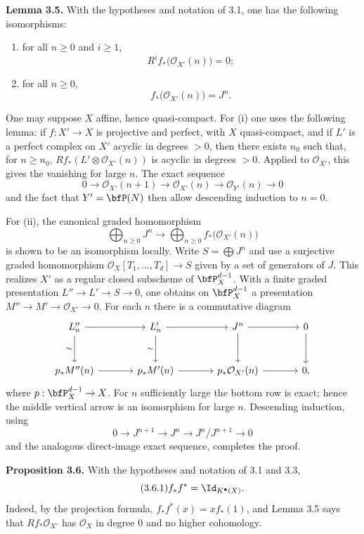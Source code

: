 \documentclass[11pt]{article}
\providecommand{\cO}{\mathcal O}
\begin{document}
\textbf{Lemma 3.5.} With the hypotheses and notation of 3.1, one has the following isomorphisms:
\begin{enumerate}[label=\roman*)]
\item for all \(n\ge0\) and \(i\ge1\),
\[
R^if_*\bigl(\cO_{X'}(n)\bigr)=0;
\]
\item for all \(n\ge0\),
\[
f_*\bigl(\cO_{X'}(n)\bigr)=J^n.
\]
\end{enumerate}
One may suppose \(X\) affine, hence quasi-compact. For (i) one uses the following lemma: if \(f:X'\to X\) is projective and perfect, with \(X\) quasi-compact, and if \(L'\) is a perfect complex on \(X'\) acyclic in degrees \(>0\), then there exists \(n_0\) such that, for \(n\ge n_0\), \(Rf_*(L'\otimes\cO_{X'}(n))\) is acyclic in degrees \(>0\). Applied to \(\cO_{X'}\), this gives the vanishing for large \(n\). The exact sequence
\[
0\to \cO_{X'}(n+1)\to\cO_{X'}(n)\to\cO_{Y'}(n)\to0
\]
and the fact that \(Y'=\bfP(N)\) then allow descending induction to \(n=0\).

For (ii), the canonical graded homomorphism
\[
\bigoplus_{n\ge0}J^n\longrightarrow\bigoplus_{n\ge0}f_*\bigl(\cO_{X'}(n)\bigr)
\]
is shown to be an isomorphism locally. Write \(S=\bigoplus J^n\) and use a surjective graded homomorphism \(\cO_X[T_1,\ldots,T_d]\to S\) given by a set of generators of \(J\). This realizes \(X'\) as a regular closed subscheme of \(\bfP_X^{d-1}\). With a finite graded presentation \(L''\to L'\to S\to0\), one obtains on \(\bfP_X^{d-1}\) a presentation \(M''\to M'\to\cO_{X'}\to0\). For each \(n\) there is a commutative diagram
\[
\begin{tikzcd}[column sep=large,row sep=large]
L''_n \arrow[r] \arrow[d,"\sim"'] & L'_n \arrow[r] \arrow[d,"\sim"'] & J^n \arrow[r] \arrow[d] & 0 \arrow[d]\\
p_*M''(n) \arrow[r] & p_*M'(n) \arrow[r] & p_*\cO_{X'}(n) \arrow[r] & 0,
\end{tikzcd}
\]
where \(p:\bfP_X^{d-1}\to X\). For \(n\) sufficiently large the bottom row is exact; hence the middle vertical arrow is an isomorphism for large \(n\). Descending induction, using
\[
0\to J^{n+1}\to J^n\to J^n/J^{n+1}\to0
\]
and the analogous direct-image exact sequence, completes the proof.

\textbf{Proposition 3.6.} With the hypotheses and notation of 3.1 and 3.3,
\begin{equation}\tag{3.6.1}
f_*f^*=\Id_{K^\bullet(X)}.
\end{equation}
Indeed, by the projection formula, \(f_*f^*(x)=x f_*(1)\), and Lemma 3.5 says that \(Rf_*\cO_{X'}\) has \(\cO_X\) in degree \(0\) and no higher cohomology.
\end{document}
